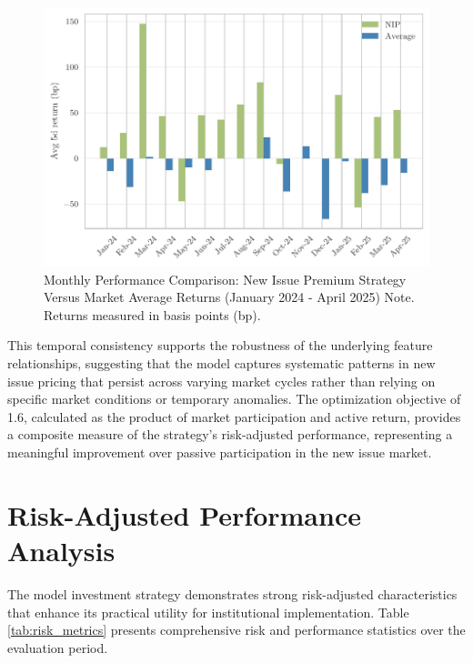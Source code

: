\begin{figure}[h]
    \begin{center}
        \includegraphics[width=\textwidth]{images/monthly_comparison.pdf}
    \end{center}
    \caption{Monthly Performance Comparison: New Issue Premium Strategy Versus Market Average Returns (January 2024 - April 2025) Note. Returns measured in basis points (bp).}
    \label{fig:monthly_performance}
\end{figure}

This temporal consistency supports the robustness of the underlying feature relationships, suggesting that the model captures systematic patterns in new issue pricing that persist across varying market cycles rather than relying on specific market conditions or temporary anomalies. The optimization objective of 1.6, calculated as the product of market participation and active return, provides a composite measure of the strategy's risk-adjusted performance, representing a meaningful improvement over passive participation in the new issue market.

\section{Risk-Adjusted Performance Analysis}

The model investment strategy demonstrates strong risk-adjusted characteristics that enhance its practical utility for institutional implementation. Table \ref{tab:risk_metrics} presents comprehensive risk and performance statistics over the evaluation period.

